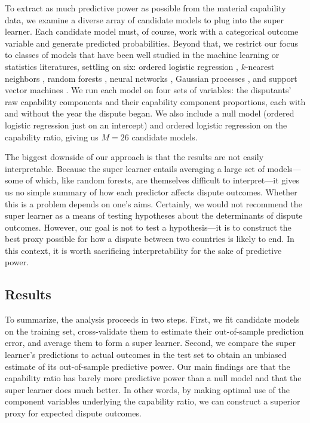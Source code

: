 To extract as much predictive power as possible from the material capability data, we examine a diverse array of candidate models to plug into the super learner.
Each candidate model must, of course, work with a categorical outcome variable and generate predicted probabilities.
Beyond that, we restrict our focus to classes of models that have been well studied in the machine learning or statistics literatures, settling on six: ordered logistic regression \citep{McKelvey:2010gv}, $k$-nearest neighbors \citep{Cover:1967jq}, random forests \citep{Breiman:2001fb}, neural networks \citep{Ripley:1996vd}, Gaussian processes \citep{Rasmussen:2006vz}, and support vector machines \citep{Cortes:1995ie}.
We run each model on four sets of variables: the disputants' raw capability components and their capability component proportions, each with and without the year the dispute began.
We also include a null model (ordered logistic regression just on an intercept) and ordered logistic regression on the capability ratio, giving us $M = 26$ candidate models.

The biggest downside of our approach is that the results are not easily interpretable.
Because the super learner entails averaging a large set of models---some of which, like random forests, are themselves difficult to interpret---it gives us no simple summary of how each predictor affects dispute outcomes.
Whether this is a problem depends on one's aims.
Certainly, we would not recommend the super learner as a means of testing hypotheses about the determinants of dispute outcomes.
However, our goal is not to test a hypothesis---it is to construct the best proxy possible for how a dispute between two countries is likely to end.
In this context, it is worth sacrificing interpretability for the sake of predictive power.

\subsection{Results}

To summarize, the analysis proceeds in two steps.
First, we fit candidate models on the training set, cross-validate them to estimate their out-of-sample prediction error, and average them to form a super learner.
Second, we compare the super learner's predictions to actual outcomes in the test set to obtain an unbiased estimate of its out-of-sample predictive power.
Our main findings are that the capability ratio has barely more predictive power than a null model and that the super learner does much better.
In other words, by making optimal use of the component variables underlying the capability ratio, we can construct a superior proxy for expected dispute outcomes.

